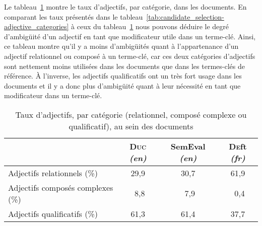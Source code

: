       Le tableau~\ref{tab:candidate_selection-adjective_categories_in_documents}
      montre le taux d'adjectifs, par catégorie, dans les documents. En
      comparant les taux présentés dans le
      tableau~\ref{tab:candidate_selection-adjective_categories} à ceux du
      tableau~\ref{tab:candidate_selection-adjective_categories_in_documents}
      nous pouvons déduire le degré d'ambigüité d'un adjectif en tant que
      modificateur utile dans un terme-clé. Ainsi, ce tableau montre qu'il y a
      moins d'ambigüités quant à l'appartenance d'un adjectif relationnel ou
      composé à un terme-clé, car ces deux catégories d'adjectifs sont nettement
      moins utilisées dans les documents que dans les termes-clés de référence.
      À l'inverse, les adjectifs qualificatifs ont un très fort usage dans les
      documents et il y a donc plus d'ambigüité quant à leur nécessité en tant
      que modificateur dans un terme-clé.
      \begin{table}[!h]
        \centering
          \begin{tabular}{l|ccc}
            \toprule
            & \textbf{\textsc{Duc}} \textit{(en)} & \textbf{SemEval} \textit{(en)} & \textbf{\textsc{De}ft} \textit{(fr)}\\
            \hline
            Adjectifs relationnels \hfill(\%) & 29,9 & 30,7 & 61,9\\
            Adjectifs composés complexes \hfill(\%) & $~~$8,8 & $~~$7,9 & $~~$0,4\\
            Adjectifs qualificatifs \hfill(\%) & 61,3 & 61,4 & 37,7\\
            \bottomrule
        \end{tabular}
        \caption{Taux d'adjectifs, par catégorie (relationnel, composé complexe
                 ou qualificatif), au sein des documents}
                 \label{tab:candidate_selection-adjective_categories_in_documents}
      \end{table}

